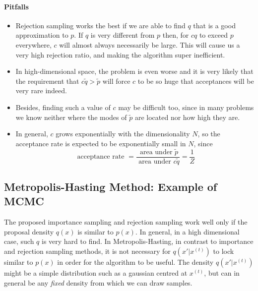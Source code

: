 \documentclass[11pt]{article}
\begin{document}
\paragraph{Pitfalls}
\begin{itemize}
    \item Rejection sampling works the best if we are able to find $q$ that is a good approximation to $p$. If $q$ is very different from $p$ then, for $cq$ to exceed $p$ everywhere, $c$ will almost always necessarily be large. This will cause us a very high rejection ratio, and making the algorithm super inefficient. 
    \item In high-dimensional space, the problem is even worse and it is very likely that the requirement that $c \tilde q > \tilde p$ will force $c$ to be so huge that acceptances will be very rare indeed. 
    \item Besides, finding such a value of $c$ may be difficult too, since in many problems we know neither where the modes of $\tilde p$ are located nor how high they are. 
    \item In general, $c$ grows exponentially with the dimensionality $N$, so the acceptance rate is expected to be exponentially small in $N$, since
    \begin{equation}
        \text{ acceptance rate } =\frac{\text { area under } \tilde{p}}{\text { area under } c \tilde{q}}=\frac{1}{Z}
    \end{equation}
\end{itemize}


\subsection{Metropolis-Hasting Method: Example of MCMC}
The proposed importance sampling and rejection sampling work well only if the proposal density $q(x)$ is similar to $p(x)$. In general, in a high dimensional case, such $q$ is very hard to find. 
In Metropolis-Hasting, in contrast to importance and rejection sampling methods, it is not necessary for $q(x'| x^{(t)})$ to lock similar to $p(x)$ in order for the algorithm to be useful. The density $q(x'| x^{(t)})$ might be a simple distribution such as a gaussian centred at $x^{(t)}$, but can in general be any \textit{fixed} density from which we can draw samples. 
\end{document}
